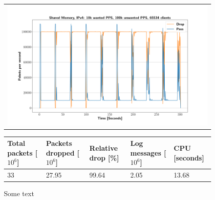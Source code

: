 \begin{figure}[p]
	\label{fig:simplefail2ban:shm:ip4:100k}
	\centering
	\scriptsize
	\begin{tabular}{c}
    	\centerline{\includegraphics[width=1.2\textwidth]{images/simplefail2ban_shm_ipv4_v10k_iv100k_c65534.png}}
	\end{tabular}
	\begin{tabular}{lllll}
		\toprule
		\textbf{Total packets [$10^6$]} & \textbf{Packets dropped [$10^6$]} & \textbf{Relative drop [\%]} & \textbf{Log messages [$10^6$]} & \textbf{CPU [seconds]} \\ \midrule 
		33 & 27.95 & 99.64 & 2.05 & 13.68 \\
		\bottomrule
	\end{tabular}
	\caption[Simplefail2ban, Shared Memory, IPv4, 1m \ac{PPS}]{Some text}
\end{figure}

